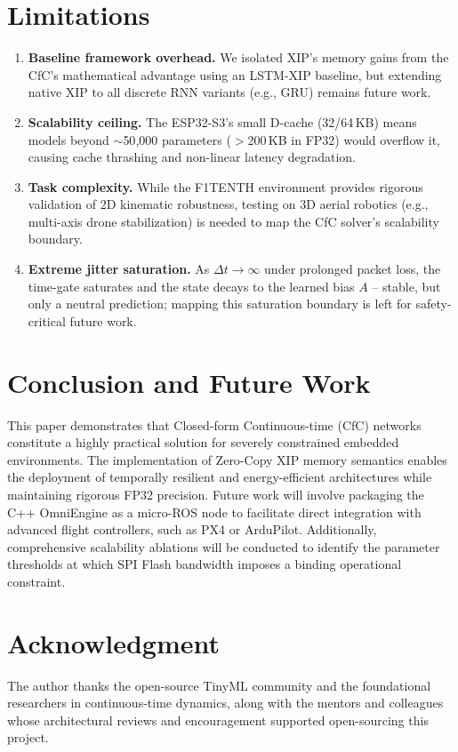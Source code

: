 \documentclass[conference]{IEEEtran}
\begin{document}
\section{Limitations}
\begin{enumerate}
\item \textbf{Baseline framework overhead.} We isolated XIP's memory gains from the CfC's mathematical advantage using an LSTM-XIP baseline, but extending native XIP to all discrete RNN variants (e.g., GRU) remains future work.
\item \textbf{Scalability ceiling.} The ESP32-S3's small D-cache (32/64\,KB) means models beyond $\sim$50{,}000 parameters ($>$200\,KB in FP32) would overflow it, causing cache thrashing and non-linear latency degradation.
\item \textbf{Task complexity.} While the F1TENTH environment provides rigorous validation of 2D kinematic robustness, testing on 3D aerial robotics (e.g., multi-axis drone stabilization) is needed to map the CfC solver's scalability boundary.
\item \textbf{Extreme jitter saturation.} As $\Delta t \to \infty$ under prolonged packet loss, the time-gate saturates and the state decays to the learned bias $A$ -- stable, but only a neutral prediction; mapping this saturation boundary is left for safety-critical future work.
\end{enumerate}

\section{Conclusion and Future Work}
This paper demonstrates that Closed-form Continuous-time (CfC) networks constitute a highly practical solution for severely constrained embedded environments. The implementation of Zero-Copy XIP memory semantics enables the deployment of temporally resilient and energy-efficient architectures while maintaining rigorous FP32 precision. Future work will involve packaging the C++ OmniEngine as a micro-ROS node to facilitate direct integration with advanced flight controllers, such as PX4 or ArduPilot. Additionally, comprehensive scalability ablations will be conducted to identify the parameter thresholds at which SPI Flash bandwidth imposes a binding operational constraint.

\section*{Acknowledgment}
The author thanks the open-source TinyML community and the foundational researchers in continuous-time dynamics, along with the mentors and colleagues whose architectural reviews and encouragement supported open-sourcing this project.
\end{document}
